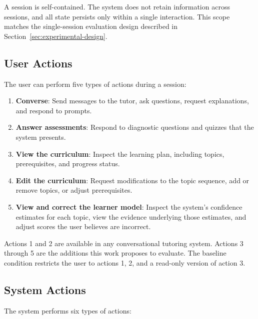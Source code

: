 \documentclass[logo,bsc,singlespacing,parskip,online]{infthesis}
\begin{document}
A session is self-contained. The system does not retain information across sessions, and all state persists only within a single interaction. This scope matches the single-session evaluation design described in Section~\ref{sec:experimental-design}.

\subsection{User Actions}

The user can perform five types of actions during a session:

\begin{enumerate}
    \item \textbf{Converse}: Send messages to the tutor, ask questions, request explanations, and respond to prompts.
    \item \textbf{Answer assessments}: Respond to diagnostic questions and quizzes that the system presents.
    \item \textbf{View the curriculum}: Inspect the learning plan, including topics, prerequisites, and progress status.
    \item \textbf{Edit the curriculum}: Request modifications to the topic sequence, add or remove topics, or adjust prerequisites.
    \item \textbf{View and correct the learner model}: Inspect the system's confidence estimates for each topic, view the evidence underlying those estimates, and adjust scores the user believes are incorrect.
\end{enumerate}

Actions 1 and 2 are available in any conversational tutoring system. Actions 3 through 5 are the additions this work proposes to evaluate. The baseline condition restricts the user to actions 1, 2, and a read-only version of action 3.

\subsection{System Actions}

The system performs six types of actions:
\end{document}
